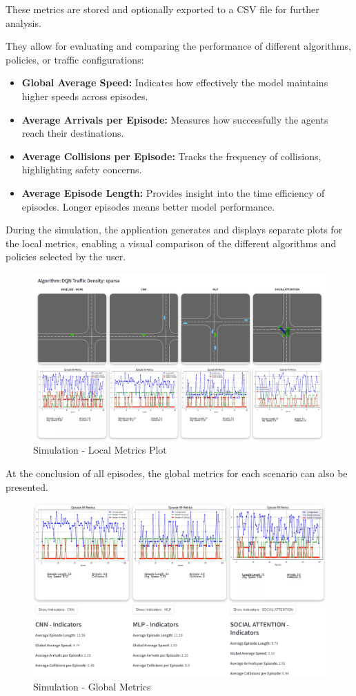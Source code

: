 These metrics are stored and optionally exported to a CSV file for further analysis. 

They allow for evaluating and comparing the performance of different algorithms, policies, or traffic configurations:
\begin{itemize}
    \item \textbf{Global Average Speed:} Indicates how effectively the model maintains higher speeds across episodes.
    \item \textbf{Average Arrivals per Episode:} Measures how successfully the agents reach their destinations.
    \item \textbf{Average Collisions per Episode:} Tracks the frequency of collisions, highlighting safety concerns.
    \item \textbf{Average Episode Length:} Provides insight into the time efficiency of episodes. Longer episodes means better model performance.
\end{itemize}

During the simulation, the application generates and displays separate plots for the local metrics, enabling a visual comparison of the different algorithms and policies selected by the user. 


\begin{figure}[H]
    \centering
    \includegraphics[height=0.4\textheight]{images/app_plots.png} 
    \caption{Simulation - Local Metrics Plot}
\end{figure}

At the conclusion of all episodes, the global metrics for each scenario can also be presented.

\begin{figure}[H]
    \centering
    \includegraphics[height=0.4\textheight]{images/app_global_metrics.png} 
    \caption{Simulation - Global Metrics}
\end{figure}



